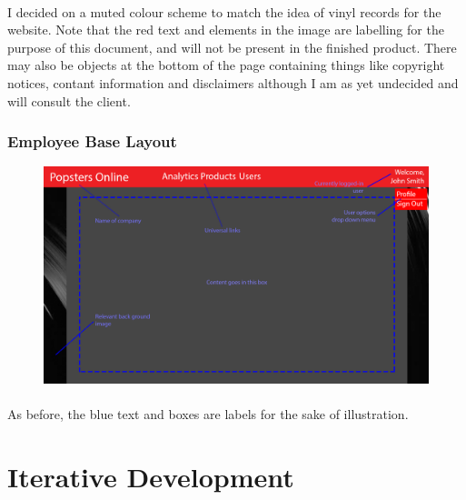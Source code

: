 ﻿\documentclass{article}
\begin{document}
    \paragraph{}
    I decided on a muted colour scheme to match the idea of vinyl records for the website.
    Note that the red text and elements in the image are labelling for the purpose of this document, and will not be present in the finished product.
    There may also be objects at the bottom of the page containing things like copyright notices, contant information and disclaimers although I am as yet undecided and will consult the client.
    
    \newpage
    \subsubsection{Employee Base Layout}
    \begin{figure}[h]
        \includegraphics[width=\textwidth]{employeeBasic.png}
        \centering
    \end{figure}
    \paragraph{}
    As before, the blue text and boxes are labels for the sake of illustration.
    \section{Iterative Development}
\end{document}
